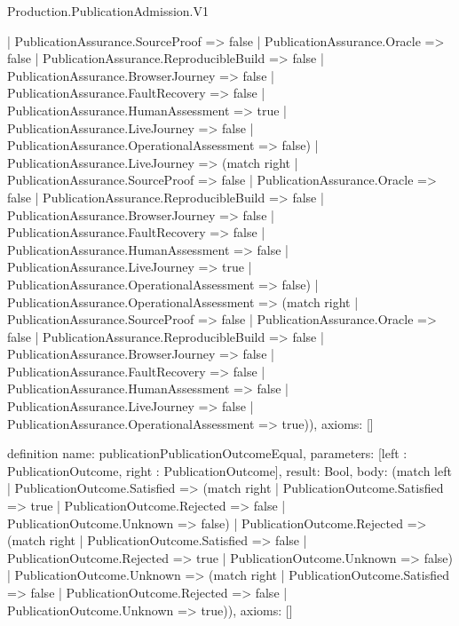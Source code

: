 \begin{lexlean}{Production.PublicationAdmission.V1}
\begin{semanticmodule}
{      | PublicationAssurance.SourceProof => false
      | PublicationAssurance.Oracle => false
      | PublicationAssurance.ReproducibleBuild => false
      | PublicationAssurance.BrowserJourney => false
      | PublicationAssurance.FaultRecovery => false
      | PublicationAssurance.HumanAssessment => true
      | PublicationAssurance.LiveJourney => false
      | PublicationAssurance.OperationalAssessment => false)
    | PublicationAssurance.LiveJourney => (match right
      | PublicationAssurance.SourceProof => false
      | PublicationAssurance.Oracle => false
      | PublicationAssurance.ReproducibleBuild => false
      | PublicationAssurance.BrowserJourney => false
      | PublicationAssurance.FaultRecovery => false
      | PublicationAssurance.HumanAssessment => false
      | PublicationAssurance.LiveJourney => true
      | PublicationAssurance.OperationalAssessment => false)
    | PublicationAssurance.OperationalAssessment => (match right
      | PublicationAssurance.SourceProof => false
      | PublicationAssurance.Oracle => false
      | PublicationAssurance.ReproducibleBuild => false
      | PublicationAssurance.BrowserJourney => false
      | PublicationAssurance.FaultRecovery => false
      | PublicationAssurance.HumanAssessment => false
      | PublicationAssurance.LiveJourney => false
      | PublicationAssurance.OperationalAssessment => true)),
  axioms: []
}

definition{
  name: publicationPublicationOutcomeEqual,
  parameters: [left : PublicationOutcome, right : PublicationOutcome],
  result: Bool,
  body: (match left
    | PublicationOutcome.Satisfied => (match right
      | PublicationOutcome.Satisfied => true
      | PublicationOutcome.Rejected => false
      | PublicationOutcome.Unknown => false)
    | PublicationOutcome.Rejected => (match right
      | PublicationOutcome.Satisfied => false
      | PublicationOutcome.Rejected => true
      | PublicationOutcome.Unknown => false)
    | PublicationOutcome.Unknown => (match right
      | PublicationOutcome.Satisfied => false
      | PublicationOutcome.Rejected => false
      | PublicationOutcome.Unknown => true)),
  axioms: []
}


\end{semanticmodule}
\end{lexlean}
